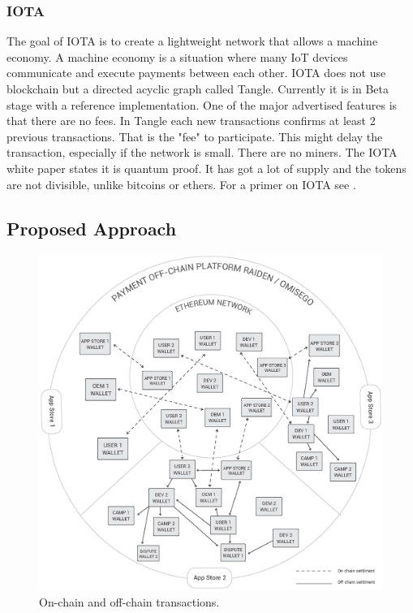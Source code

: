 \subsubsection{IOTA}
The goal of IOTA is to create a lightweight network that allows a machine economy. A machine economy is a situation where many IoT devices communicate and execute payments between each other. IOTA does not use blockchain but a directed acyclic graph called Tangle. Currently it is in Beta stage with a reference implementation. One of the major advertised features is that there are no fees. In Tangle each new transactions confirms at least 2 previous transactions. That is the "fee" to participate. This might delay the transaction, especially if the network is small. There are no miners. The IOTA white paper states it is quantum proof. It has got a lot of supply and the tokens are not divisible, unlike bitcoins or ethers. For a primer on IOTA see \cite{IOTA}.

\subsection{Proposed Approach}


\begin{figure}[!ht]
\centering
\includegraphics[width=\textwidth]{diagrams/offchain_wallets.eps}
\caption{On-chain and off-chain transactions.}
\label{fig:offchain}
\end{figure}


